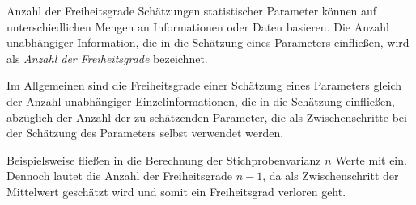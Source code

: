 \begin{bonus}{Anzahl der Freiheitsgrade}
    Schätzungen statistischer Parameter können auf unterschiedlichen Mengen an Informationen oder Daten basieren.
    Die Anzahl unabhängiger Information, die in die Schätzung eines Parameters einfließen, wird als \emph{Anzahl der Freiheitsgrade} bezeichnet.

    Im Allgemeinen sind die Freiheitsgrade einer Schätzung eines Parameters gleich der Anzahl unabhängiger Einzelinformationen, die in die Schätzung einfließen, abzüglich der Anzahl der zu schätzenden Parameter, die als Zwischenschritte bei der Schätzung des Parameters selbst verwendet werden.

    Beispielsweise fließen in die Berechnung der Stichprobenvarianz $n$ Werte mit ein.
    Dennoch lautet die Anzahl der Freiheitsgrade $n-1$, da als Zwischenschritt der Mittelwert geschätzt wird und somit ein Freiheitsgrad verloren geht.
\end{bonus}

